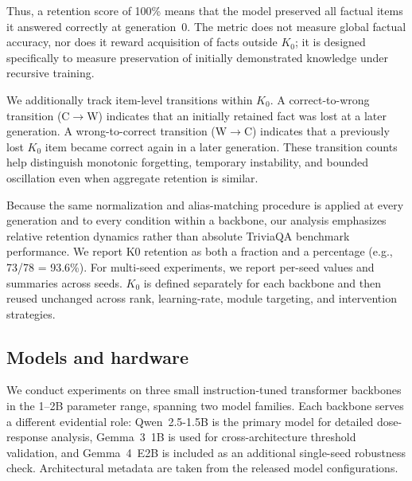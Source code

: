 \documentclass[a4paper,fleqn]{cas-dc}
\begin{document}
Thus, a retention score of 100\% means that the model preserved all factual
items it answered correctly at generation~0. The metric does not measure global
factual accuracy, nor does it reward acquisition of facts outside $K_0$; it is
designed specifically to measure preservation of initially demonstrated
knowledge under recursive training.

We additionally track item-level transitions within $K_0$. A
correct-to-wrong transition (C$\to$W) indicates that an initially retained fact
was lost at a later generation. A wrong-to-correct transition (W$\to$C)
indicates that a previously lost $K_0$ item became correct again in a later
generation. These transition counts help distinguish monotonic forgetting,
temporary instability, and bounded oscillation even when aggregate retention is
similar.

Because the same normalization and alias-matching procedure is applied at every
generation and to every condition within a backbone, our analysis emphasizes
relative retention dynamics rather than absolute TriviaQA benchmark performance.
We report K0 retention as both a fraction and a percentage (e.g.,
73/78 = 93.6\%). For multi-seed experiments, we report per-seed values and
summaries across seeds. $K_0$ is defined separately
for each backbone and then reused unchanged across rank, learning-rate, module
targeting, and intervention strategies.

\subsection{Models and hardware}\label{sec:models}

We conduct experiments on three small instruction-tuned transformer backbones in
the 1--2B parameter range, spanning two model families. Each backbone serves a
different evidential role: Qwen~2.5-1.5B is the primary model for detailed
dose-response analysis, Gemma~3~1B is used for cross-architecture threshold
validation, and Gemma~4~E2B is included as an additional single-seed robustness
check. Architectural metadata are taken from the released model configurations.
\end{document}
